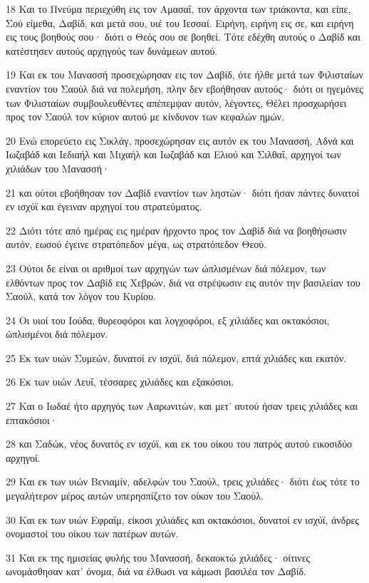 \par 18 Και το Πνεύμα περιεχύθη εις τον Αμασαΐ, τον άρχοντα των τριάκοντα, και είπε, Σού είμεθα, Δαβίδ, και μετά σου, υιέ του Ιεσσαί. Ειρήνη, ειρήνη εις σε, και ειρήνη εις τους βοηθούς σου· διότι ο Θεός σου σε βοηθεί. Τότε εδέχθη αυτούς ο Δαβίδ και κατέστησεν αυτούς αρχηγούς των δυνάμεων αυτού.
\par 19 Και εκ του Μανασσή προσεχώρησαν εις τον Δαβίδ, ότε ήλθε μετά των Φιλισταίων εναντίον του Σαούλ διά να πολεμήση, πλην δεν εβοήθησαν αυτούς· διότι οι ηγεμόνες των Φιλισταίων συμβουλευθέντες απέπεμψαν αυτόν, λέγοντες, Θέλει προσχωρήσει προς τον Σαούλ τον κύριον αυτού με κίνδυνον των κεφαλών ημών.
\par 20 Ενώ επορεύετο εις Σικλάγ, προσεχώρησαν εις αυτόν εκ του Μανασσή, Αδνά και Ιωζαβάδ και Ιεδιαήλ και Μιχαήλ και Ιωζαβάδ και Ελιού και Σιλθαΐ, αρχηγοί των χιλιάδων του Μανασσή·
\par 21 και ούτοι εβοήθησαν τον Δαβίδ εναντίον των ληστών· διότι ήσαν πάντες δυνατοί εν ισχύϊ και έγειναν αρχηγοί του στρατεύματος.
\par 22 Διότι τότε από ημέρας εις ημέραν ήρχοντο προς τον Δαβίδ διά να βοηθήσωσιν αυτόν, εωσού έγεινε στρατόπεδον μέγα, ως στρατόπεδον Θεού.
\par 23 Ούτοι δε είναι οι αριθμοί των αρχηγών των ώπλισμένων διά πόλεμον, των ελθόντων προς τον Δαβίδ εις Χεβρών, διά να στρέψωσιν εις αυτόν την βασιλείαν του Σαούλ, κατά τον λόγον του Κυρίου.
\par 24 Οι υιοί του Ιούδα, θυρεοφόροι και λογχοφόροι, εξ χιλιάδες και οκτακόσιοι, ώπλισμένοι διά πόλεμον.
\par 25 Εκ των υιών Συμεών, δυνατοί εν ισχύϊ, διά πόλεμον, επτά χιλιάδες και εκατόν.
\par 26 Εκ των υιών Λευΐ, τέσσαρες χιλιάδες και εξακόσιοι.
\par 27 Και ο Ιωδαέ ήτο αρχηγός των Ααρωνιτών, και μετ' αυτού ήσαν τρεις χιλιάδες και επτακόσιοι·
\par 28 και Σαδώκ, νέος δυνατός εν ισχύϊ, και εκ του οίκου του πατρός αυτού εικοσιδύο αρχηγοί.
\par 29 Και εκ των υιών Βενιαμίν, αδελφών του Σαούλ, τρεις χιλιάδες· διότι έως τότε το μεγαλήτερον μέρος αυτών υπερησπίζετο τον οίκον του Σαούλ.
\par 30 Και εκ των υιών Εφραΐμ, είκοσι χιλιάδες και οκτακόσιοι, δυνατοί εν ισχύϊ, άνδρες ονομαστοί του οίκου των πατέρων αυτών.
\par 31 Και εκ της ημισείας φυλής του Μανασσή, δεκαοκτώ χιλιάδες· οίτινες ωνομάσθησαν κατ' όνομα, διά να έλθωσι να κάμωσι βασιλέα τον Δαβίδ.
